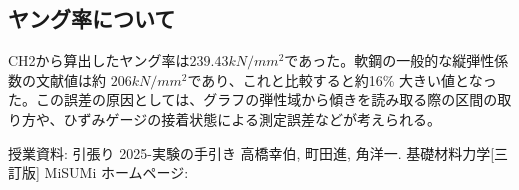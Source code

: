 \documentclass[11pt, a4paper, dvipdfmx]{jsreport}
\begin{document}
\subsection{ヤング率について}
CH2から算出したヤング率は$239.43kN/mm^2$であった。軟鋼の一般的な縦弾性係数の文献値は約 $206 kN/mm^2$であり、これと比較すると約16\%
大きい値となった。この誤差の原因としては、グラフの弾性域から傾きを読み取る際の区間の取り方や、ひずみゲージの接着状態による測定誤差などが考えられる。

\begin{thebibliography}{99}
     授業資料: 引張り 2025-実験の手引き
     高橋幸伯, 町田進, 角洋一. 基礎材料力学[三訂版]
     MiSUMi ホームページ: 
\end{thebibliography}
\end{document}
